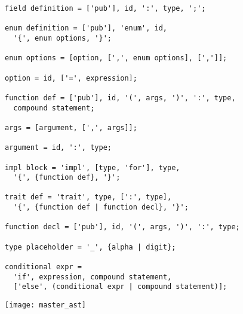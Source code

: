 \documentclass[main.tex]{subfiles}
\begin{document}
\begin{center}
\begin{verbatim}
field definition = ['pub'], id, ':', type, ';';

enum definition = ['pub'], 'enum', id,
  '{', enum options, '}';

enum options = [option, [',', enum options], [',']];

option = id, ['=', expression];

function def = ['pub'], id, '(', args, ')', ':', type,
  compound statement;

args = [argument, [',', args]];

argument = id, ':', type;

impl block = 'impl', [type, 'for'], type,
  '{', {function def}, '}';

trait def = 'trait', type, [':', type],
  '{', {function def | function decl}, '}';

function decl = ['pub'], id, '(', args, ')', ':', type;

type placeholder = '_', {alpha | digit};

conditional expr =
  'if', expression, compound statement,
  ['else', (conditional expr | compound statement)];
\end{verbatim}
\end{center}

\begin{center}
%
%
%
%
%
%
%
%
%
%
%
%
\noindent\texttt{[image: master\_ast]}
\end{center}
\end{document}
